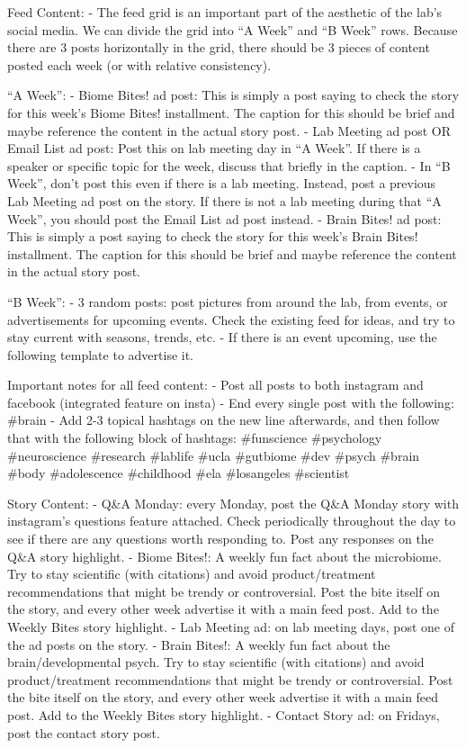 \documentclass[]{book}
\begin{document}
Feed Content:
- The feed grid is an important part of the aesthetic of the lab's social media. We can divide the grid into ``A Week'' and ``B Week'' rows. Because there are 3 posts horizontally in the grid, there should be 3 pieces of content posted each week (or with relative consistency).

``A Week'':
- Biome Bites! ad post: This is simply a post saying to check the story for this week's Biome Bites! installment. The caption for this should be brief and maybe reference the content in the actual story post.
- Lab Meeting ad post OR Email List ad post: Post this on lab meeting day in ``A Week''. If there is a speaker or specific topic for the week, discuss that briefly in the caption.
- In ``B Week'', don't post this even if there is a lab meeting. Instead, post a previous Lab Meeting ad post on the story. If there is not a lab meeting during that ``A Week'', you should post the Email List ad post instead.
- Brain Bites! ad post: This is simply a post saying to check the story for this week's Brain Bites! installment. The caption for this should be brief and maybe reference the content in the actual story post.

``B Week'':
- 3 random posts: post pictures from around the lab, from events, or advertisements for upcoming events. Check the existing feed for ideas, and try to stay current with seasons, trends, etc.
- If there is an event upcoming, use the following template to advertise it.

Important notes for all feed content:
- Post all posts to both instagram and facebook (integrated feature on insta)
- End every single post with the following: \#brain
- Add 2-3 topical hashtags on the new line afterwards, and then follow that with the following block of hashtags: \#funscience \#psychology \#neuroscience \#research \#lablife \#ucla \#gutbiome \#dev \#psych \#brain \#body \#adolescence \#childhood \#ela \#losangeles \#scientist

Story Content:
- Q\&A Monday: every Monday, post the Q\&A Monday story with instagram's questions feature attached. Check periodically throughout the day to see if there are any questions worth responding to. Post any responses on the Q\&A story highlight.
- Biome Bites!: A weekly fun fact about the microbiome. Try to stay scientific (with citations) and avoid product/treatment recommendations that might be trendy or controversial. Post the bite itself on the story, and every other week advertise it with a main feed post. Add to the Weekly Bites story highlight.
- Lab Meeting ad: on lab meeting days, post one of the ad posts on the story.
- Brain Bites!: A weekly fun fact about the brain/developmental psych. Try to stay scientific (with citations) and avoid product/treatment recommendations that might be trendy or controversial. Post the bite itself on the story, and every other week advertise it with a main feed post. Add to the Weekly Bites story highlight.
- Contact Story ad: on Fridays, post the contact story post.
\end{document}
